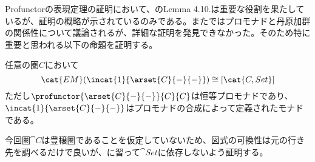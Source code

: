 \documentclass[uplatex,dvipdfmx]{jsarticle}
\begin{document}
  Profunctorの表現定理の証明において、\cite{profunctor_optics_update}のLemma 4.10.は重要な役割を果たしているが、証明の概略が示されているのみである。また\cite{doubles_for_monoidal}ではプロモナドと丹原加群の関係性について議論されるが、詳細な証明を発見できなかった。そのため特に重要と思われる以下の命題を証明する。

  \begin{prop}[EM圏による関手圏の表現]\label{prop-representation-of-functor-category-as-em}
    任意の圏$C$において\[\cat{EM}(\incat{1}{\arset{C}{-}{-}})\cong[\cat{C,Set}]\]
    ただし$\profunctor{\arset{C}{-}{-}}{C}{C}$は恒等プロモナドであり、$\incat{1}{\arset{C}{-}{-}}$はプロモナドの合成によって定義されたモナドである。
  \end{prop}
  今回圏$\cat{C}$は豊穣圏であることを仮定していないため、図式の可換性は元の行き先を調べるだけで良いが、\cite{profunctor_optics_update}\cite{doubles_for_monoidal}に習って$\cat{Set}$に依存しないよう証明する。
\end{document}
